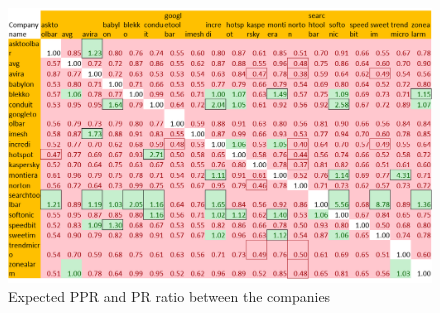 \documentclass[11pt,oneside]{book}
\begin{document}
\begin{figure}[h]
\centering
    \includegraphics[scale=0.8]{figures/RatioMatrixPortrate.png}
    \caption{Expected PPR and PR ratio between the companies}
    \label{fig:RatioMatrix}
\end{figure}

\end{document}
